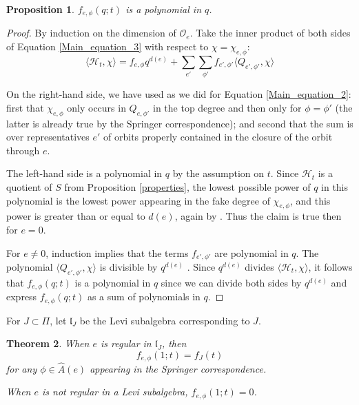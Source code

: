 \documentclass[10pt]{amsart}
\newcommand{\orbit}{\mathcal O}
\newcommand{\levi}{\mathfrak l}
\newcommand{\ar}{{\hat{A}}(e)}
\renewcommand{\H}{{\mathcal{H}_t}}
\theoremstyle{plain}
\newtheorem{theorem}{Theorem}
\newtheorem{proposition}[theorem]{Proposition}
\theoremstyle{definition}
\theoremstyle{remark}
\begin{document}
\begin{proposition}  \label{poly}
$f_{e, \phi}(q; t)$ is a polynomial in $q$.
\end{proposition}

\begin{proof}
By induction on the dimension of $\orbit_e$.   
Take the inner product of both sides 
of Equation \ref{Main_equation_3} with respect to $\chi = \chi_{e, \phi}$:
$$\langle \H, \chi \rangle  =  f_{e, \phi} q^{d(e)} + \sum_{e'} \sum_{\phi'} f_{e', \phi'} \langle Q_{e', \phi'}, \chi \rangle$$

On the right-hand side, we have used \cite{borho-mac} as we did for Equation \ref{Main_equation_2}:  
first that $\chi_{e,\phi}$ only occurs in $Q_{e, \phi'}$ in the top degree and then only for $\phi = \phi'$ 
(the latter is already true by the Springer correspondence); 
and second 
that the sum is over representatives $e'$ of orbits properly contained in the closure of the orbit through $e$.

The left-hand side is a polynomial in $q$ by the assumption on $t$.  Since $\H$ is a quotient of $S$ 
from Proposition \ref{properties},
the lowest possible power of $q$ in this polynomial is the lowest power 
appearing in the fake degree of $\chi_{e,\phi}$, and this power 
is greater than or equal to $d(e)$, again by \cite{borho-mac}. 
Thus the claim is true then for $e=0$.

For $e \neq 0$, induction implies that the terms $f_{e', \phi'}$ are polynomial in $q$.
The polynomial $\langle Q_{e', \phi'}, \chi \rangle$ is divisible by $q^{d(e)}$ \cite{borho-mac}. 
Since $q^{d(e)}$ divides $\langle \H, \chi \rangle$, 
it follows that $f_{e, \phi}(q;t)$ is a polynomial in $q$ since we can divide both sides by $q^{d(e)}$ and express 
$f_{e, \phi}(q;t)$ as a sum of polynomials in $q$.
\end{proof}


For $J \subset \Pi$, let $\levi_J$ be the Levi subalgebra corresponding to $J$.

\begin{theorem}  \label{q to 1}
When $e$ is regular in $\levi_J$, then 
$$f_{e, \phi}(1; t) = f_J(t)$$
for any $\phi \in \ar$ appearing in the Springer correspondence.


When $e$ is not regular in a Levi subalgebra,
$f_{e, \phi}(1; t) = 0$.
\end{theorem}
\end{document}
